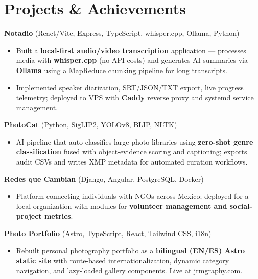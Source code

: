 \documentclass[10pt, letterpaper]{article}
\newenvironment{cvlist}{%
  \begin{itemize}[leftmargin=1.4em,itemsep=1pt,topsep=2pt,parsep=0pt]
}{\end{itemize}}
\begin{document}
\section{Projects \& Achievements}

\noindent\textbf{Notadio} (React/Vite, Express, TypeScript, whisper.cpp, Ollama, Python)

\begin{cvlist}
  \item Built a \textbf{local-first audio/video transcription} application ---
        processes media with \textbf{whisper.cpp} (no API costs) and generates
        AI summaries via \textbf{Ollama} using a MapReduce chunking pipeline
        for long transcripts.
  \item Implemented speaker diarization, SRT/JSON/TXT export, live progress
        telemetry; deployed to VPS with \textbf{Caddy} reverse proxy and
        systemd service management.
\end{cvlist}

\smallskip

\noindent\textbf{PhotoCat} (Python, SigLIP2, YOLOv8, BLIP, NLTK)

\begin{cvlist}
  \item AI pipeline that auto-classifies large photo libraries using
        \textbf{zero-shot genre classification} fused with object-evidence
        scoring and captioning; exports audit CSVs and writes XMP metadata
        for automated curation workflows.
\end{cvlist}

\smallskip

\noindent\textbf{Redes que Cambian} (Django, Angular, PostgreSQL, Docker)

\begin{cvlist}
  \item Platform connecting individuals with NGOs across Mexico; deployed for a
        local organization with modules for \textbf{volunteer management and
        social-project metrics}.
\end{cvlist}

\smallskip

\noindent\textbf{Photo Portfolio} (Astro, TypeScript, React, Tailwind CSS, i18n)

\begin{cvlist}
  \item Rebuilt personal photography portfolio as a \textbf{bilingual (EN/ES)
        Astro static site} with route-based internationalization, dynamic
        category navigation, and lazy-loaded gallery components. Live at
        \href{https://jrmgraphy.com}{jrmgraphy.com}.
\end{cvlist}
\end{document}
